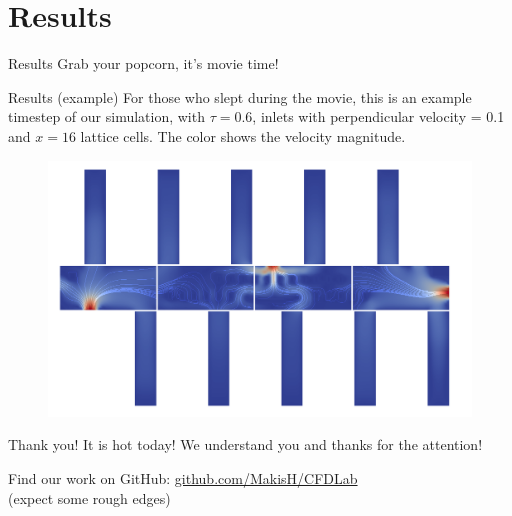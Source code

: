 \documentclass[9pt,pdftex]{beamer}
\begin{document}
\section{Results}
 \begin{frame}{Results}
  Grab your popcorn, it's movie time!
 \end{frame}
 
 \begin{frame}{Results (example)}
  For those who slept during the movie, this is an example timestep of
  our simulation, with $\tau=0.6$, inlets with perpendicular velocity = 0.1 and $x=16$ lattice cells.
  The color shows the velocity magnitude. %
  \begin{figure}
   \includegraphics[width=0.8\linewidth]{results_3inlets_streamlines}
  \end{figure}
 \end{frame}
 
 \begin{frame}{Thank you!}
  It is hot today! We understand you and thanks for the attention!
  \vspace{1cm}
  
  Find our work on GitHub: \href{https://github.com/MakisH/CFDLab}{\url{github.com/MakisH/CFDLab}} \\
  (expect some rough edges)
  
 \end{frame}



 
\end{document}
